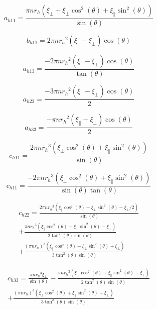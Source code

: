 \documentclass[12pt,a4paper,titlepage]{report}
\begin{document}
\begin{equation}
a_{h11} = \frac{\pi n r_h (\xi_{\perp} + \xi_{\perp} \cos^2(\theta) + \xi_{\parallel} \sin^2(\theta))}{\sin(\theta) }
\label{ah22}
\end{equation} 

\begin{equation}
b_{h11} = 2\pi n {r_h}^2 (\xi_{\parallel} - \xi_{\perp})\cos(\theta)
\label{bh11}
\end{equation} 


\begin{equation}
a_{h13} = \frac{-2 \pi n {r_h}^2 (\xi_{\parallel} - \xi_{\perp})\cos(\theta)}{\tan(\theta) }
\label{bh13}
\end{equation} 


\begin{equation}
a_{h22} = \frac{-3 \pi n {r_h}^2 (\xi_{\parallel} - \xi_{\perp})\cos(\theta)}{2}
\label{bh22}
\end{equation} 


\begin{equation}
a_{h33} = \frac{- \pi n {r_h}^2 (\xi_{\parallel} - \xi_{\perp})\cos(\theta)}{2}
\label{bh33}
\end{equation} 



\begin{equation}
c_{h11} = \frac{2\pi n {r_h}^3 (\xi_{\perp} \cos^2(\theta) + \xi_{\parallel} \sin^2(\theta))}{\sin(\theta) }
\label{ch11}
\end{equation} 


\begin{equation}
c_{h11} = \frac{-2\pi n {r_h}^3 (\xi_{\perp} \cos^2(\theta) + \xi_{\parallel} \sin^2(\theta))}{\sin(\theta) \tan(\theta)}
\label{ch13}
\end{equation}


\begin{multline}
c_{h22} = \frac{2\pi n {r_h}^3 (\xi_{\parallel} \cos^2(\theta) + \xi_{\perp} \sin^2(\theta) - \xi_{\perp}/2)}{\sin(\theta) } \\
+ \frac{\pi n {r_h}^3 (\xi_{\parallel} \cos^2(\theta) - \xi_{\perp} \sin^2(\theta) - \xi_{\perp})}{2{\tan^2(\theta)}\sin(\theta)}\\
+ \frac{(\pi n {r_h})^3 (\xi_{\parallel} \cos^2(\theta) - \xi_{\perp} \sin^2(\theta) + \xi_{\perp})}{3{\tan^2(\theta)}\sin(\theta)}
\label{ch22}
\end{multline}



\begin{multline}
c_{h33} = \frac{\pi n {r_h}^3 \xi_{\perp} }{\sin(\theta) }- \frac{\pi n {r_h}^3 (\xi_{\perp} \cos^2(\theta) + \xi_{\parallel} \sin^2(\theta) - \xi_{\perp})}{2{\tan^2(\theta)}\sin(\theta)}\\
+ \frac{(\pi n {r_h})^3 (\xi_{\perp} \cos^2(\theta) + \xi_{\parallel} \sin^2(\theta) + \xi_{\perp})}{3{\tan^2(\theta)}\sin(\theta)}
\label{ch33}
\end{multline}
\end{document}
